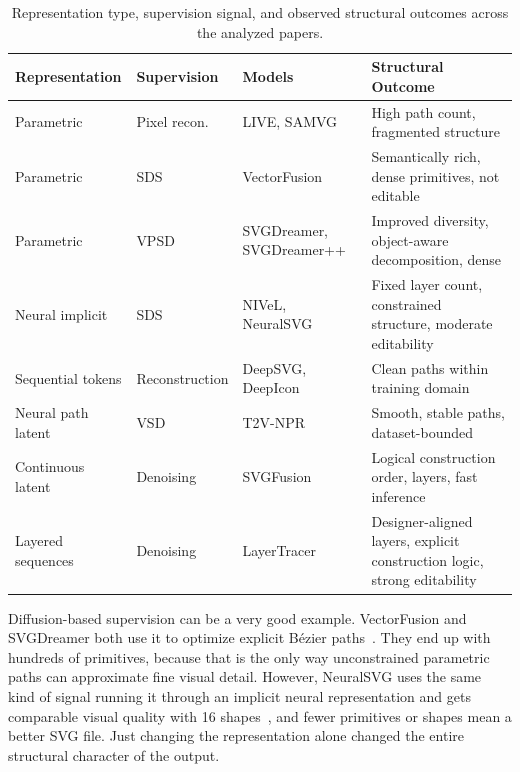 \begin{table}[htbp]
\centering
\caption{Representation type, supervision signal, 
and observed structural outcomes across the 
analyzed papers.}
\label{tab:representation_outcomes}
\small
\begin{tabularx}{\textwidth}{l l l X}
\toprule
\textbf{Representation} & \textbf{Supervision} & 
\textbf{Models} & \textbf{Structural Outcome} \\
\midrule
Parametric    & Pixel recon.   & LIVE, SAMVG       
              & High path count, 
                fragmented structure \\
Parametric    & SDS            & VectorFusion      
              & Semantically rich, dense primitives, 
                not editable \\
Parametric    & VPSD           & SVGDreamer, SVGDreamer++ 
              & Improved diversity, object-aware 
                decomposition, dense \\
Neural implicit & SDS          & NIVeL, NeuralSVG  
              & Fixed layer count, constrained 
                structure, moderate editability \\
Sequential tokens & Reconstruction & DeepSVG, DeepIcon 
              & Clean paths within training domain \\
Neural path latent & VSD       & T2V-NPR           
              & Smooth, stable paths, 
                dataset-bounded \\
Continuous latent & Denoising  & SVGFusion         
              & Logical construction order, 
                layers, fast inference \\
Layered sequences & Denoising  & LayerTracer       
              & Designer-aligned layers, explicit 
                construction logic, strong editability \\
\bottomrule
\end{tabularx}
\end{table}

Diffusion-based supervision can be a very good example. VectorFusion 
and SVGDreamer both use it to optimize explicit B\'{e}zier 
paths~\cite{jainVectorFusionTexttoSVGAbstracting2022, 
xingSVGDreamerTextGuided2024}. They end up with hundreds of 
primitives, because that is the only way unconstrained 
parametric paths can approximate fine visual detail.
However, NeuralSVG uses the same kind of signal running it through 
an implicit neural representation and gets comparable 
visual quality with 16 
shapes~\cite{polaczekNeuralSVGImplicitRepresentation2025},
and fewer primitives or shapes mean a better SVG file.
Just changing the representation alone changed the entire structural character of the output.

